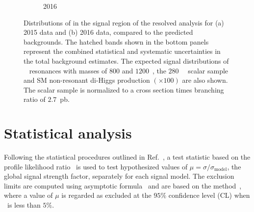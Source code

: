 \begin{figure}[htb!]
\begin{center}
\begin{subfigure}[b]{0.39\textwidth}
        \caption{2016}
        \label{fig:resolvedHHUnblinded-2016}
    \end{subfigure}
  \caption{Distributions of \mfourj in the signal region of the resolved analysis for (a) 2015 data and (b) 2016 data, compared to the predicted backgrounds. The hatched bands shown in the bottom panels represent the combined statistical and systematic uncertainties in the total background estimates. The expected signal distributions of \Grav~ resonances with masses of $800$ and $1200$~\GeV, the $280$~\GeV~ scalar sample and SM non-resonant di-Higgs production $(\times 100)$ are also shown. The scalar sample is normalized to a cross section times branching ratio of $2.7$~pb.}
  \label{fig:resolvedHHUnblinded}
\end{center}
\end{figure}


\section{Statistical analysis}
\label{sec:observedlimits}

\paragraph{}
Following the statistical procedures outlined in Ref.~\cite{Aad:2012tfa}, a test statistic based on the profile likelihood ratio~\cite{Cowan:2010js} is used to test hypothesized values of $\mu=\sigma/\sigma_{\mathrm{model}}$, the global signal strength factor, separately for each signal model. 
The exclusion limits are computed using asymptotic formula~\cite{Cowan:2010js} and are based on the \cls method~\cite{Read:2002hq}, where a value of $\mu$ is regarded as excluded at the $95\%$ confidence level (CL) when \cls~is less than $5\%$.

